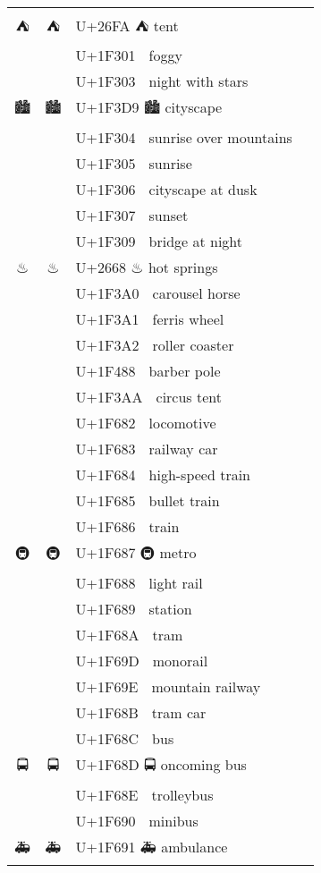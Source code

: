 \documentclass[a4paper,12pt]{article}
\newcommand{\fontA}[1]{{\fontspec[RawFeature={mode=harf,+dist,+ccmp}]{Segoe UI Emoji} #1}}
\newcommand{\fontB}[1]{{\fontspec[RawFeature={mode=harf,+dist,+ccmp}]{Noto Color Emoji} #1}}
\begin{document}
\begin{longtable}[c]{ccp{0.8\linewidth}}
\fontA{⛺}&\fontB{⛺}&U+26FA ⛺ tent\\
\fontA{🌁}&\fontB{🌁}&U+1F301 🌁 foggy\\
\fontA{🌃}&\fontB{🌃}&U+1F303 🌃 night with stars\\
\fontA{🏙}&\fontB{🏙}&U+1F3D9 🏙 cityscape\\
\fontA{🌄}&\fontB{🌄}&U+1F304 🌄 sunrise over mountains\\
\fontA{🌅}&\fontB{🌅}&U+1F305 🌅 sunrise\\
\fontA{🌆}&\fontB{🌆}&U+1F306 🌆 cityscape at dusk\\
\fontA{🌇}&\fontB{🌇}&U+1F307 🌇 sunset\\
\fontA{🌉}&\fontB{🌉}&U+1F309 🌉 bridge at night\\
\fontA{♨}&\fontB{♨}&U+2668 ♨ hot springs\\
\fontA{🎠}&\fontB{🎠}&U+1F3A0 🎠 carousel horse\\
\fontA{🎡}&\fontB{🎡}&U+1F3A1 🎡 ferris wheel\\
\fontA{🎢}&\fontB{🎢}&U+1F3A2 🎢 roller coaster\\
\fontA{💈}&\fontB{💈}&U+1F488 💈 barber pole\\
\fontA{🎪}&\fontB{🎪}&U+1F3AA 🎪 circus tent\\
\fontA{🚂}&\fontB{🚂}&U+1F682 🚂 locomotive\\
\fontA{🚃}&\fontB{🚃}&U+1F683 🚃 railway car\\
\fontA{🚄}&\fontB{🚄}&U+1F684 🚄 high-speed train\\
\fontA{🚅}&\fontB{🚅}&U+1F685 🚅 bullet train\\
\fontA{🚆}&\fontB{🚆}&U+1F686 🚆 train\\
\fontA{🚇}&\fontB{🚇}&U+1F687 🚇 metro\\
\fontA{🚈}&\fontB{🚈}&U+1F688 🚈 light rail\\
\fontA{🚉}&\fontB{🚉}&U+1F689 🚉 station\\
\fontA{🚊}&\fontB{🚊}&U+1F68A 🚊 tram\\
\fontA{🚝}&\fontB{🚝}&U+1F69D 🚝 monorail\\
\fontA{🚞}&\fontB{🚞}&U+1F69E 🚞 mountain railway\\
\fontA{🚋}&\fontB{🚋}&U+1F68B 🚋 tram car\\
\fontA{🚌}&\fontB{🚌}&U+1F68C 🚌 bus\\
\fontA{🚍}&\fontB{🚍}&U+1F68D 🚍 oncoming bus\\
\fontA{🚎}&\fontB{🚎}&U+1F68E 🚎 trolleybus\\
\fontA{🚐}&\fontB{🚐}&U+1F690 🚐 minibus\\
\fontA{🚑}&\fontB{🚑}&U+1F691 🚑 ambulance\\

\end{longtable}
\end{document}
